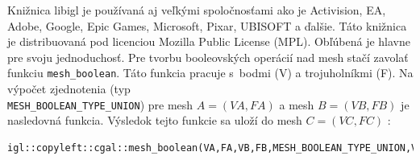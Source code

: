 Knižnica libigl je používaná aj veľkými spoločnosťami ako je Activision, EA, Adobe, Google, Epic Games, Microsoft, Pixar, UBISOFT a ďalšie. Táto knižnica je distribuovaná pod licenciou Mozilla Public License (MPL).
Obľúbená je hlavne pre svoju jednoduchosť. Pre tvorbu booleovských operácií nad mesh stačí zavolať funkciu \texttt{mesh\_boolean}.
Táto funkcia pracuje s~bodmi (V) a trojuholníkmi (F). Na výpočet zjednotenia (typ \\ \texttt{MESH\_BOOLEAN\_TYPE\_UNION}) pre mesh $A=(VA,FA)$ a mesh $B=(VB,FB)$ je nasledovná funkcia. Výsledok tejto funkcie sa uloží do mesh $C=(VC,FC)$ \cite{libigl}:

\begin{lstlisting}[breaklines=false]
igl::copyleft::cgal::mesh_boolean(VA,FA,VB,FB,MESH_BOOLEAN_TYPE_UNION,VC,FC);
\end{lstlisting}






















































